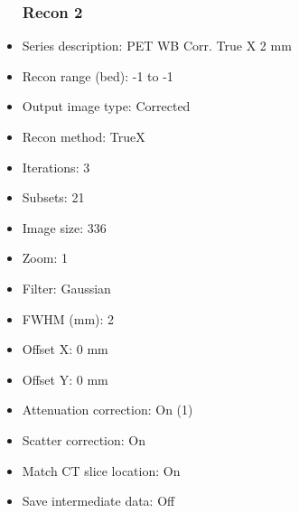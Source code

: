 \documentclass[12pt]{article}
\begin{document}
\begin{itemize}[noitemsep]
\subsubsection{Recon 2}
\item Series description: PET WB Corr. True X 2 mm
\item Recon range (bed): -1 to -1
\item Output image type: Corrected
\item Recon method: TrueX
\item Iterations: 3
\item Subsets: 21
\item Image size: 336
\item Zoom: 1
\item Filter: Gaussian
\item FWHM (mm): 2
\item Offset X: 0 mm
\item Offset Y: 0 mm
\item Attenuation correction: On (1)
\item Scatter correction: On
\item Match CT slice location: On
\item Save intermediate data: Off
\end{itemize}
\end{document}
